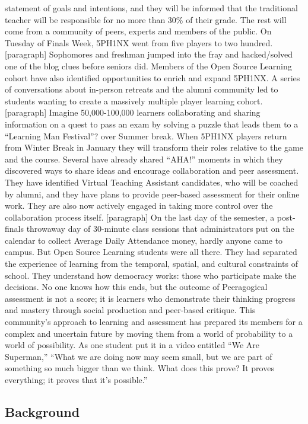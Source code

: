 statement of goals and intentions, and they will be informed that the
traditional teacher will be responsible for no more than 30\% of their
grade. The rest will come from a community of peers, experts and members
of the public. On Tuesday of Finals Week, 5PH1NX went from five players
to two hundred. {[}paragraph{]} Sophomores and freshman jumped into the
fray and hacked/solved one of the blog clues before seniors did. Members
of the Open Source Learning cohort have also identified opportunities to
enrich and expand 5PH1NX. A series of conversations about in-person
retreats and the alumni community led to students wanting to create a
massively multiple player learning cohort. {[}paragraph{]} Imagine
50,000-100,000 learners collaborating and sharing information on a quest
to pass an exam by solving a puzzle that leads them to a ``Learning Man
Festival''? over Summer break. When 5PH1NX players return from Winter
Break in January they will transform their roles relative to the game
and the course. Several have already shared ``AHA!'' moments in which
they discovered ways to share ideas and encourage collaboration and peer
assessment. They have identified Virtual Teaching Assistant candidates,
who will be coached by alumni, and they have plans to provide peer-based
assessment for their online work. They are also now actively engaged in
taking more control over the collaboration process itself.
{[}paragraph{]} On the last day of the semester, a post-finals throwaway
day of 30-minute class sessions that administrators put on the calendar
to collect Average Daily Attendance money, hardly anyone came to campus.
But Open Source Learning students were all there. They had separated the
experience of learning from the temporal, spatial, and cultural
constraints of school. They understand how democracy works: those who
participate make the decisions. No one knows how this ends, but the
outcome of Peeragogical assessment is not a score; it is learners who
demonstrate their thinking progress and mastery through social
production and peer-based critique. This community's approach to
learning and assessment has prepared its members for a complex and
uncertain future by moving them from a world of probability to a world
of possibility. As one student put it in a video entitled ``We Are
Superman,'' ``What we are doing now may seem small, but we are part of
something so much bigger than we think. What does this prove? It proves
everything; it proves that it's possible.''

\hypertarget{background}{%
\subsection{Background}\label{background}}

